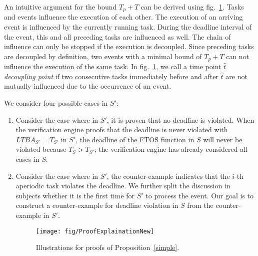 \documentclass[10pt, a4paper, onecolumn, conference, compsocconf]{IEEEtran}
\begin{document}
An intuitive argument for the bound $T_p+T$ can be derived using fig.~\ref{fig:Proof.Explanation}. Tasks and events influence the execution of each other. The execution of an arriving event is influenced by the currently running task. During the deadline interval of the event, this and all preceding tasks are influenced as well. The chain of influence can only be stopped if the execution is decoupled. Since preceding tasks are decoupled by definition, two events with a minimal bound of $T_p+T$ can not influence the execution of the same task. In fig.~\ref{fig:Proof.Explanation}, we call a time point $\hat{t}$ \emph{decoupling point} if two consecutive tasks immediately before and after $\hat{t}$ are not mutually influenced due to the occurrence of an event.



\begin{IEEEproof}
We consider four possible cases in $S'$:
\begin{enumerate}
    \item Consider the case where in $S'$, it is proven that no deadline is violated. When the verification engine proofs that the deadline is never
            violated with $LTBA_{S'}=T_{S'}$ in $S'$, the deadline of the FTOS function in $S$ will never be violated because $T_{S} > T_{S'}$; the verification engine has already considered  all cases in $S$.
    \item Consider the case where in $S'$, the counter-example indicates that the $i$-th aperiodic task violates the deadline. We further split the discussion in subjects whether it is the first time for $S'$ to process the event. Our goal is to construct a counter-example for deadline violation in $S$ from the counter-example in $S'$.
\begin{figure}
 \centering
 \texttt{[image: fig/ProofExplainationNew]}
 \caption{Illustrations for proofs of Proposition~\ref{simple}.}
 \label{fig:Proof.Explanation}


\end{figure}
\end{enumerate}
\end{IEEEproof}
\end{document}
